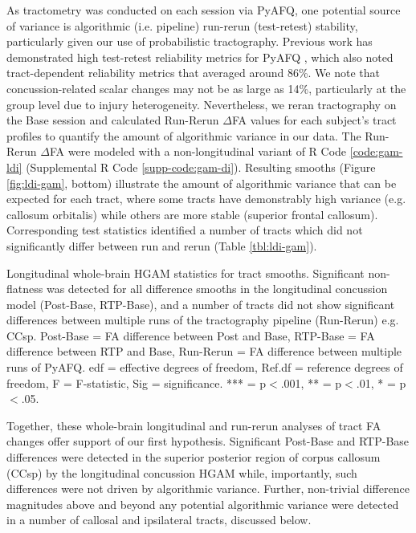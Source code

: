 \documentclass[12pt]{article}
\begin{document}
As tractometry was conducted on each session via PyAFQ, one potential source of variance is algorithmic (i.e. pipeline) run-rerun (test-retest) stability, particularly given our use of probabilistic tractography. Previous work has demonstrated high test-retest reliability metrics for PyAFQ \parencite{kruper2021EvaluatingReliabilityHuman}, which also noted tract-dependent reliability metrics that averaged around 86\%. We note that concussion-related scalar changes may not be as large as 14\%, particularly at the group level due to injury heterogeneity. Nevertheless, we reran tractography on the Base session and calculated Run-Rerun $\Delta$FA values for each subject's tract profiles to quantify the amount of algorithmic variance in our data. The Run-Rerun $\Delta$FA were modeled with a non-longitudinal variant of R Code \ref{code:gam-ldi} (Supplemental R Code \ref{supp-code:gam-di}). Resulting smooths (Figure \ref{fig:ldi-gam}, bottom) illustrate the amount of algorithmic variance that can be expected for each tract, where some tracts have demonstrably high variance (e.g. callosum orbitalis) while others are more stable (superior frontal callosum). Corresponding test statistics identified a number of tracts which did not significantly differ between run and rerun (Table \ref{tbl:ldi-gam}).

\begin{table}[H]
	\footnotesize
	
	\caption{Longitudinal whole-brain HGAM statistics for tract smooths. Significant non-flatness was detected for all difference smooths in the longitudinal concussion model (Post-Base, RTP-Base), and a number of tracts did not show significant differences between multiple runs of the tractography pipeline (Run-Rerun) e.g. CCsp. Post-Base = FA difference between Post and Base, RTP-Base = FA difference between RTP and Base, Run-Rerun = FA difference between multiple runs of PyAFQ. edf = effective degrees of freedom, Ref.df = reference degrees of freedom, F = F-statistic, Sig = significance. *** = p$<$.001, ** = p$<$.01, * = p$<$.05.}
	\label{tbl:ldi-gam}
\end{table}

Together, these whole-brain longitudinal and run-rerun analyses of tract FA changes offer support of our first hypothesis. Significant Post-Base and RTP-Base differences were detected in the superior posterior region of corpus callosum (CCsp) by the longitudinal concussion HGAM while, importantly, such differences were not driven by algorithmic variance. Further, non-trivial difference magnitudes above and beyond any potential algorithmic variance were detected in a number of callosal and ipsilateral tracts, discussed below.
\end{document}
